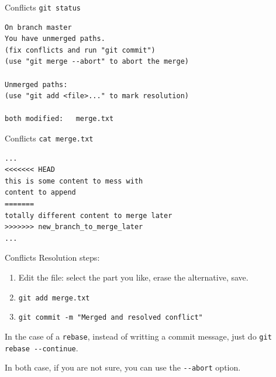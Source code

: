 \documentclass[usenames,dvipsnames,9pt]{beamer}
\begin{document}
%
\begin{frame}[fragile]{Conflicts}
  \lstinline|git status|

  \begin{lstlisting}[basicstyle=\footnotesize\ttfamily]
On branch master
You have unmerged paths.
(fix conflicts and run "git commit")
(use "git merge --abort" to abort the merge)

Unmerged paths:
(use "git add <file>..." to mark resolution)

both modified:   merge.txt
  \end{lstlisting}
\end{frame}

%
\begin{frame}[fragile]{Conflicts}
  \lstinline|cat merge.txt|

  \begin{lstlisting}[basicstyle=\footnotesize\ttfamily]
...
<<<<<<< HEAD
this is some content to mess with
content to append
=======
totally different content to merge later
>>>>>>> new_branch_to_merge_later
...
  \end{lstlisting}
\end{frame}

%
\begin{frame}{Conflicts}
  Resolution steps:
  \begin{enumerate}
    \item Edit the file: select the part you like, erase the alternative, save.
    \item \lstinline|git add merge.txt|
    \item \lstinline|git commit -m "Merged and resolved conflict"|
  \end{enumerate}

  In the case of a \lstinline|rebase|, instead of writting a commit message, just do
  \lstinline|git rebase --continue|.

  In both case, if you are not sure, you can use the \lstinline|--abort| option.
\end{frame}



%
%
\end{document}
